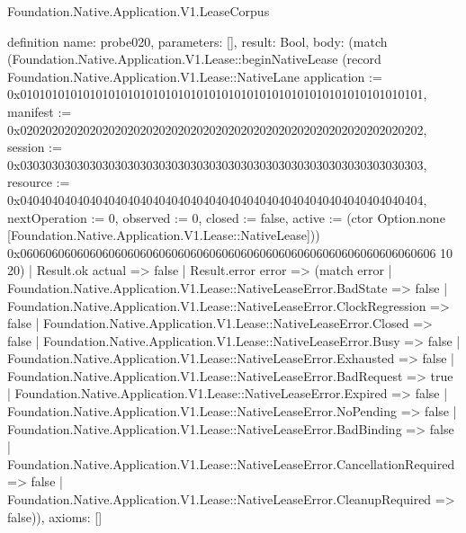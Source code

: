 \begin{lexlean}{Foundation.Native.Application.V1.LeaseCorpus}
\begin{semanticmodule}
definition{
  name: probe020,
  parameters: [],
  result: Bool,
  body: (match (Foundation.Native.Application.V1.Lease::beginNativeLease (record Foundation.Native.Application.V1.Lease::NativeLane {application := 0x0101010101010101010101010101010101010101010101010101010101010101, manifest := 0x0202020202020202020202020202020202020202020202020202020202020202, session := 0x0303030303030303030303030303030303030303030303030303030303030303, resource := 0x0404040404040404040404040404040404040404040404040404040404040404, nextOperation := 0, observed := 0, closed := false, active := (ctor Option.none [Foundation.Native.Application.V1.Lease::NativeLease])}) 0x060606060606060606060606060606060606060606060606060606060606060606 10 20)
    | Result.ok actual => false
    | Result.error error => (match error
      | Foundation.Native.Application.V1.Lease::NativeLeaseError.BadState => false
      | Foundation.Native.Application.V1.Lease::NativeLeaseError.ClockRegression => false
      | Foundation.Native.Application.V1.Lease::NativeLeaseError.Closed => false
      | Foundation.Native.Application.V1.Lease::NativeLeaseError.Busy => false
      | Foundation.Native.Application.V1.Lease::NativeLeaseError.Exhausted => false
      | Foundation.Native.Application.V1.Lease::NativeLeaseError.BadRequest => true
      | Foundation.Native.Application.V1.Lease::NativeLeaseError.Expired => false
      | Foundation.Native.Application.V1.Lease::NativeLeaseError.NoPending => false
      | Foundation.Native.Application.V1.Lease::NativeLeaseError.BadBinding => false
      | Foundation.Native.Application.V1.Lease::NativeLeaseError.CancellationRequired => false
      | Foundation.Native.Application.V1.Lease::NativeLeaseError.CleanupRequired => false)),
  axioms: []
}


\end{semanticmodule}
\end{lexlean}

